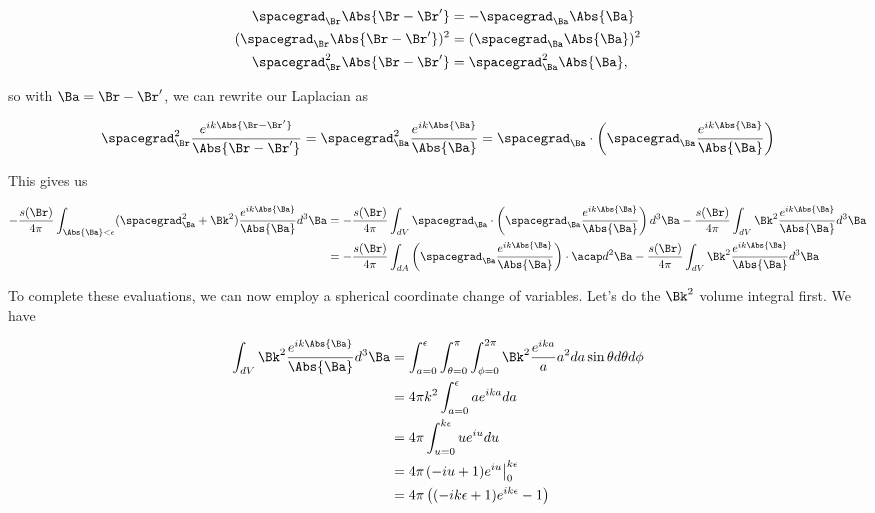 \begin{align}\label{eqn:shortTimeDepPertubation:300}
\spacegrad_\Br \Abs{\Br - \Br'} &= -\spacegrad_\Ba \Abs{\Ba} \\
(\spacegrad_\Br \Abs{\Br - \Br'})^2 &= (\spacegrad_\Ba \Abs{\Ba})^2 \\
\spacegrad_\Br^2 \Abs{\Br - \Br'} &= \spacegrad_\Ba^2 \Abs{\Ba},
\end{align}

so with $\Ba = \Br - \Br'$, we can rewrite our Laplacian as

\begin{equation}\label{eqn:shortTimeDepPertubation:310}
\spacegrad_\Br^2 \frac{e^{i k \Abs{\Br - \Br'}}}{\Abs{\Br - \Br'}} 
= 
\spacegrad_\Ba^2 \frac{e^{i k \Abs{\Ba}}}{\Abs{\Ba}} 
= 
\spacegrad_\Ba \cdot \left(\spacegrad_\Ba \frac{e^{i k \Abs{\Ba}}}{\Abs{\Ba}} \right)
\end{equation}

This gives us

\begin{align*}
-\frac{s(\Br)}{4\pi} 
\int_{\Abs{\Ba} < \epsilon} (\spacegrad_\Ba^2 + \Bk^2) \frac{e^{i k \Abs{\Ba}}}{\Abs{\Ba}} d^3 \Ba 
&=
-\frac{s(\Br)}{4\pi} 
\int_{dV} \spacegrad_\Ba \cdot \left( \spacegrad_\Ba \frac{e^{i k \Abs{\Ba}}}{\Abs{\Ba}} \right) d^3 \Ba 
-\frac{s(\Br)}{4\pi} \int_{dV}
\Bk^2 \frac{e^{i k \Abs{\Ba}}}{\Abs{\Ba}} d^3 \Ba  \\
&=
-\frac{s(\Br)}{4\pi} 
\int_{dA} \left( \spacegrad_\Ba \frac{e^{i k \Abs{\Ba}}}{\Abs{\Ba}} \right) \cdot \acap d^2 \Ba 
-\frac{s(\Br)}{4\pi} 
\int_{dV}
\Bk^2 \frac{e^{i k \Abs{\Ba}}}{\Abs{\Ba}} d^3 \Ba 
\end{align*}

To complete these evaluations, we can now employ a spherical coordinate change of variables.  Let's do the $\Bk^2$ volume integral first.  We have

\begin{align*}
\int_{dV}
\Bk^2 \frac{e^{i k \Abs{\Ba}}}{\Abs{\Ba}} d^3 \Ba 
&=
\int_{a = 0}^\epsilon \int_{\theta = 0}^\pi \int_{\phi=0}^{2\pi}
\Bk^2 \frac{e^{i k a}}{a} a^2 da \sin\theta d\theta d\phi \\
&=
4\pi k^2
\int_{a = 0}^\epsilon 
a e^{i k a} da  \\
&=
4\pi 
\int_{u = 0}^{k\epsilon}
u e^{i u} du  \\
&=
4\pi 
{\left.
(-i u + 1) e^{i u} \right\vert}_0^{k \epsilon} \\
&=
4 \pi \left( (-i k \epsilon + 1)e^{i k \epsilon} - 1 \right)
\end{align*}

